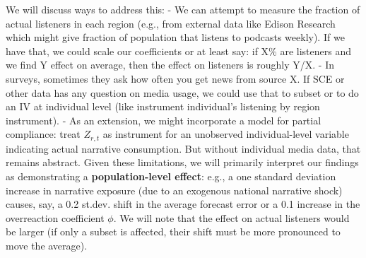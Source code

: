 \documentclass[12pt]{article}
\begin{document}
We will discuss ways to address this: - We can attempt to measure the fraction of actual listeners in each region (e.g., from external data like Edison Research which might give fraction of population that listens to podcasts weekly). If we have that, we could scale our coefficients or at least say: if X\% are listeners and we find Y effect on average, then the effect on listeners is roughly Y/X. - In surveys, sometimes they ask how often you get news from source X. If SCE or other data has any question on media usage, we could use that to subset or to do an IV at individual level (like instrument individual's listening by region instrument). - As an extension, we might incorporate a model for partial compliance: treat $Z_{r,t}$ as instrument for an unobserved individual-level variable indicating actual narrative consumption. But without individual media data, that remains abstract.
Given these limitations, we will primarily interpret our findings as demonstrating a \textbf{population-level effect}: e.g., a one standard deviation increase in narrative exposure (due to an exogenous national narrative shock) causes, say, a 0.2 st.dev. shift in the average forecast error or a 0.1 increase in the overreaction coefficient $\phi$. We will note that the effect on actual listeners would be larger (if only a subset is affected, their shift must be more pronounced to move the average).
\end{document}
